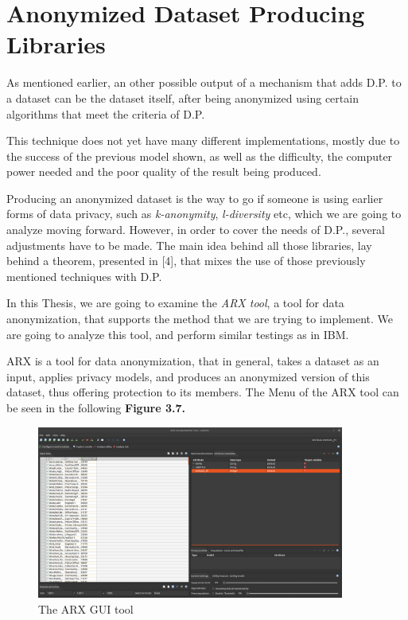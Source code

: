 \section{Anonymized Dataset Producing Libraries}

As mentioned earlier, an other possible output of a mechanism that adds D.P. to a dataset can be the dataset itself, after being anonymized using certain algorithms that meet the criteria of D.P.

This technique does not yet have many different implementations, mostly due to the success of the previous model shown, as well as the difficulty, the computer power needed and the poor quality of the result being produced.

Producing an anonymized dataset is the way to go if someone is using earlier forms of data privacy, such as \emph{k-anonymity}, \emph{l-diversity} etc, which we are going to analyze moving forward. However, in order to cover the needs of D.P., several adjustments have to be made. The main idea behind all those libraries, lay behind a theorem, presented in [4], that mixes the use of those previously mentioned techniques with D.P.

In this Thesis, we are going to examine the \emph{ARX tool}, a tool for data anonymization, that supports the method that we are trying to implement. We are going to analyze this tool, and perform similar testings as in IBM. 

ARX is a tool for data anonymization, that in general, takes a dataset as an input, applies  privacy models, and produces an anonymized version of this dataset, thus offering protection to its members. The Menu of the ARX tool can be seen in the following \textbf{Figure 3.7.}

\begin{figure}[!htb]\centering
    \includegraphics[width=0.9\textwidth]{images/arx_tool.png}
    \caption{The ARX GUI tool}
\end{figure}


